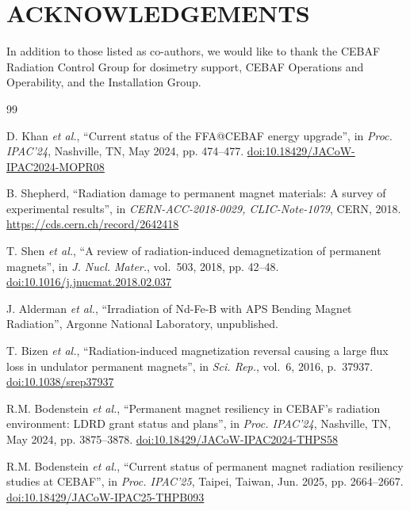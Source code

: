 \documentclass[a4paper,
               ]{jacow}
\begin{document}
\section{ACKNOWLEDGEMENTS}
In addition to those listed as co-authors, we would like to thank the CEBAF Radiation Control Group for dosimetry support, CEBAF Operations and Operability, and the Installation Group.

%
%
    {\printbibliography}%
    {%

    \begin{thebibliography}{99}   %

            D. Khan \emph{et al.},
            ``Current status of the FFA@CEBAF energy upgrade'',
            in \emph{Proc. IPAC'24}, Nashville, TN, May 2024, pp. 474--477.
            \url{doi:10.18429/JACoW-IPAC2024-MOPR08}

           B. Shepherd,
           ``Radiation damage to permanent magnet materials: A survey of experimental results'',
           in \emph{CERN-ACC-2018-0029, CLIC-Note-1079}, CERN, 2018.
           \url{https://cds.cern.ch/record/2642418}

            T. Shen \emph{et al.},
            ``A review of radiation-induced demagnetization of permanent magnets'',
            in \emph{J. Nucl. Mater.}, vol.~503, 2018, pp. 42--48.
            \url{doi:10.1016/j.jnucmat.2018.02.037}

            J. Alderman \emph{et al.},
            ``Irradiation of Nd-Fe-B with APS Bending Magnet Radiation'',
            Argonne National Laboratory, unpublished.

            T. Bizen \emph{et al.},
            ``Radiation-induced magnetization reversal causing a large flux loss in undulator permanent magnets'',
            in \emph{Sci. Rep.}, vol.~6, 2016, p.~37937.
            \url{doi:10.1038/srep37937}

            R.M. Bodenstein \emph{et al.},
            ``Permanent magnet resiliency in CEBAF's radiation environment: LDRD grant status and plans'',
            in \emph{Proc. IPAC'24}, Nashville, TN, May 2024, pp. 3875--3878.
            \url{doi:10.18429/JACoW-IPAC2024-THPS58}

             R.M. Bodenstein \emph{et al.},
            ``Current status of permanent magnet radiation resiliency studies at CEBAF'',
            in \emph{Proc. IPAC'25}, Taipei, Taiwan, Jun. 2025, pp. 2664--2667.
            \url{doi:10.18429/JACoW-IPAC25-THPB093}


\end{thebibliography}}
\end{document}
